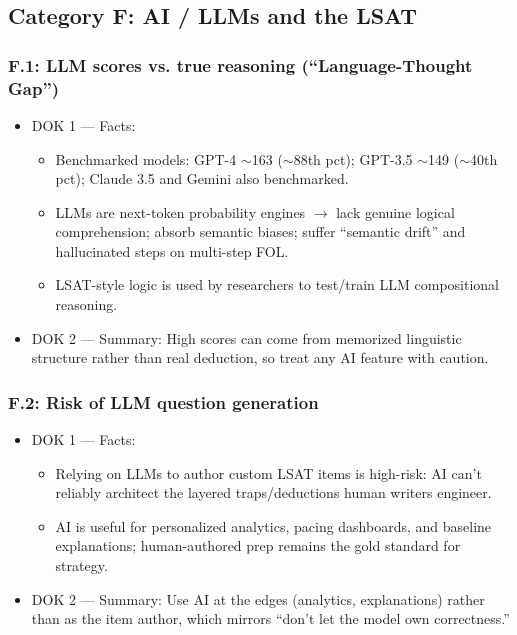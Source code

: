 \documentclass[11pt]{article}
\begin{document}
\subsection*{Category F: AI / LLMs and the LSAT}
\subsubsection*{F.1: LLM scores vs. true reasoning (\enquote{Language-Thought Gap})}
\begin{itemize}
\item DOK 1 --- Facts:
\begin{itemize}
\item Benchmarked models: GPT-4 $\sim$163 ($\sim$88th pct); GPT-3.5 $\sim$149 ($\sim$40th pct); Claude 3.5 and Gemini also benchmarked.
\item LLMs are next-token probability engines $\rightarrow$ lack genuine logical comprehension; absorb semantic biases; suffer \enquote{semantic drift} and hallucinated steps on multi-step FOL.
\item LSAT-style logic is used by researchers to test/train LLM compositional reasoning.
\end{itemize}
\item DOK 2 --- Summary: High scores can come from memorized linguistic structure rather than real deduction, so treat any AI feature with caution.
\end{itemize}
\subsubsection*{F.2: Risk of LLM question generation}
\begin{itemize}
\item DOK 1 --- Facts:
\begin{itemize}
\item Relying on LLMs to author custom LSAT items is high-risk: AI can't reliably architect the layered traps/deductions human writers engineer.
\item AI is useful for personalized analytics, pacing dashboards, and baseline explanations; human-authored prep remains the gold standard for strategy.
\end{itemize}
\item DOK 2 --- Summary: Use AI at the edges (analytics, explanations) rather than as the item author, which mirrors \enquote{don't let the model own correctness.}
\end{itemize}
\end{document}
